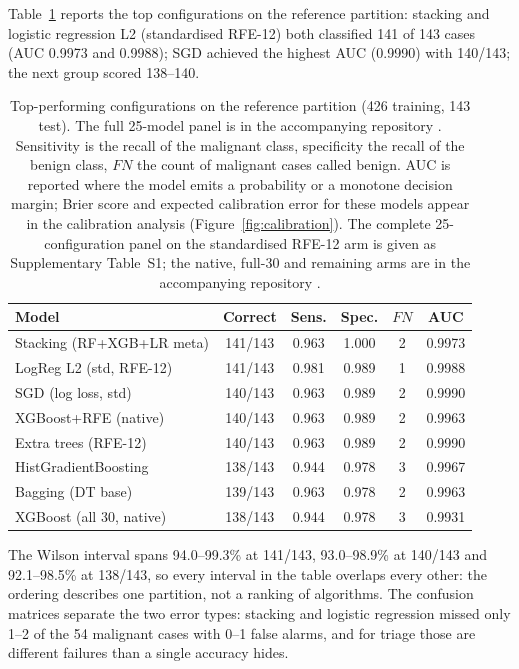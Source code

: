\documentclass[review,12pt]{elsarticle}
\renewcommand{\arraystretch}{1.12}
\begin{document}
Table~\ref{tab:models} reports the top configurations on the reference partition: stacking and logistic regression L2 (standardised RFE-12) both classified 141 of 143 cases (AUC 0.9973 and 0.9988); SGD achieved the highest AUC (0.9990) with 140/143; the next group scored 138--140.

\begin{table}[ht!]
\centering
\caption{Top-performing configurations on the reference partition (426 training, 143 test). The full 25-model panel is in the accompanying repository \cite{masaba2026code}. Sensitivity is the recall of the malignant class, specificity the recall of the benign class, $FN$ the count of malignant cases called benign. AUC is reported where the model emits a probability or a monotone decision margin; Brier score and expected calibration error for these models appear in the calibration analysis (Figure~\ref{fig:calibration}). The complete 25-configuration panel on the standardised RFE-12 arm is given as Supplementary Table~S1; the native, full-30 and remaining arms are in the accompanying repository \cite{masaba2026code}.}
\label{tab:models}
\renewcommand{\arraystretch}{1.12}
\small
\begin{tabular}{lccccc}
\hline
Model & Correct & Sens. & Spec. & $FN$ & AUC\\
\hline
Stacking (RF+XGB+LR meta) & 141/143 & 0.963 & 1.000 & 2 & 0.9973\\
LogReg L2 (std, RFE-12)   & 141/143 & 0.981 & 0.989 & 1 & 0.9988\\
SGD (log loss, std)       & 140/143 & 0.963 & 0.989 & 2 & 0.9990\\
XGBoost+RFE (native)      & 140/143 & 0.963 & 0.989 & 2 & 0.9963\\
Extra trees (RFE-12)      & 140/143 & 0.963 & 0.989 & 2 & 0.9990\\
HistGradientBoosting      & 138/143 & 0.944 & 0.978 & 3 & 0.9967\\
Bagging (DT base)         & 139/143 & 0.963 & 0.978 & 2 & 0.9963\\
XGBoost (all 30, native)  & 138/143 & 0.944 & 0.978 & 3 & 0.9931\\
\hline
\end{tabular}
\end{table}

The Wilson interval spans 94.0--99.3\% at 141/143, 93.0--98.9\% at 140/143 and 92.1--98.5\% at 138/143, so every interval in the table overlaps every other: the ordering describes one partition, not a ranking of algorithms. The confusion matrices separate the two error types: stacking and logistic regression missed only 1--2 of the 54 malignant cases with 0--1 false alarms, and for triage those are different failures than a single accuracy hides.
\end{document}
